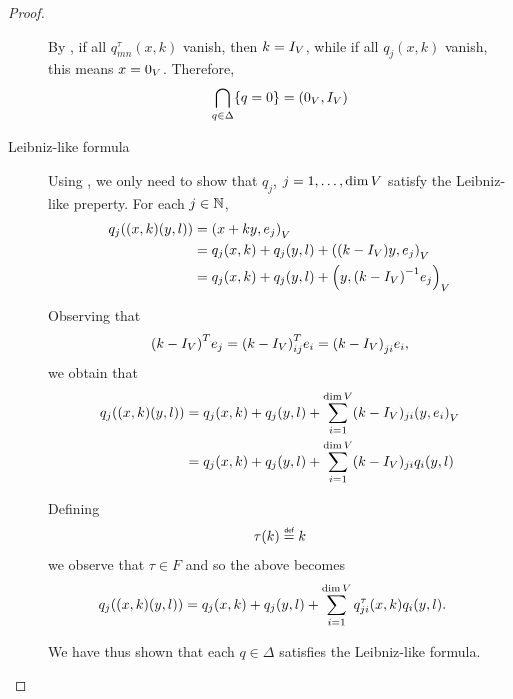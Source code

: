 \begin{proof}
\begin{description}
            By \cite[Lemma 5.11]{Fischer2015},
            if all $q^\tau_{m n}(x, k)$ vanish, then $k = {I_{V}}$,
            while if all $q_j(x, k)$ vanish, this means $x = 0_V$.
            Therefore,
            \begin{align*}
                \bigcap_{q \in \Delta} \{q = 0\} = (0_V, {I_{V}})
            \end{align*}
        \item [Leibniz-like formula]
            Using \cite[Corollary 5.13]{Fischer2015},
            we only need to show that $q_j$, $j = 1, \dots, \dim V$ satisfy the Leibniz-like preperty.
            For each $j \in \mathbb{N}$,
            \begin{align*}
                q_j((x, k) (y, l))
                &= {\left(x + k y, e_j\right)_{V}}\\
                &= q_j(x, k) + q_j(y, l) + {\left((k - {I_{V}}) y, e_j\right)_{V}}\\
                &= q_j(x, k) + q_j(y, l) + {\left(y, {(k - {I_{V}})}^{-1} e_j\right)_{V}}
            \end{align*}

            Observing that
            \begin{align*}
                {(k - {I_{V}})}^T e_j
                = {(k - {I_{V}})}^T_{i j} e_i
                = {(k - {I_{V}})}_{j i} e_i,
            \end{align*}
            we obtain that
            \begin{align*}
                q_j((x, k) (y, l))
                &= q_j(x, k) + q_j(y, l) + \sum_{i = 1}^{\dim V} (k - {I_{V}})_{j i} {\left(y, e_i\right)_{V}}\\
                &= q_j(x, k) + q_j(y, l) + \sum_{i = 1}^{\dim V} (k - {I_{V}})_{j i} q_i(y, l)
            \end{align*}

            Defining
            \begin{align*}
                \tau(k) \defeq k
            \end{align*}
            we observe that $\tau \in F$ and so the above becomes
            \begin{align*}
                q_j((x, k) (y, l))
                &= q_j(x, k) + q_j(y, l) + \sum_{i = 1}^{\dim V} q^{\tau}_{j i}(x, k) q_i(y, l).
            \end{align*}

            We have thus shown that each $q \in \Delta$ satisfies the Leibniz-like formula.
    \end{description}
\end{proof}

